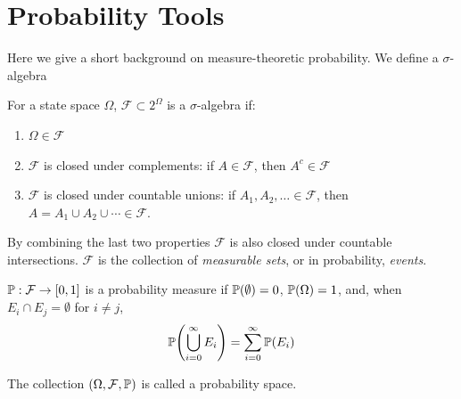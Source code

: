 \section{Probability Tools}
Here we give a short background on measure-theoretic probability. We define a $\sigma$-algebra
\begin{definition}
    For a state space $\Omega$, $\mathcal F \subset 2^\Omega$ is a $\sigma$-algebra if:
    \begin{enumerate}[nosep]
        \item $\Omega \in \mathcal F$
        \item $\mathcal F$ is closed under complements: if $A \in \mathcal F$, then $A^c \in \mathcal F$
        \item $\mathcal F$ is closed under countable unions: if $A_1, A_2, \ldots \in \mathcal F$, then $A = A_1 \cup A_2 \cup \cdots \in \mathcal F$. 
    \end{enumerate}
\end{definition}
By combining the last two properties $\mathcal F$ is also closed under countable intersections. $\mathcal F$ is the collection of \textit{measurable sets}, or in probability, \textit{events}. 
\begin{definition}
    $\mbb P: \mathcal F \to [0,1]$ is a probability measure if $\P(\emptyset) = 0$, $\P(\Omega) = 1$, and, when $E_i \cap E_j = \emptyset$ for $i \neq j$,
    \begin{align*}
        \P(\bigcup_{i=0}^{\infty} E_i) = \sum_{i=0}^{\infty} \P(E_i)
    \end{align*}
\end{definition}
The collection $(\Omega, \mathcal F, \mbb P)$ is called a probability space. 

